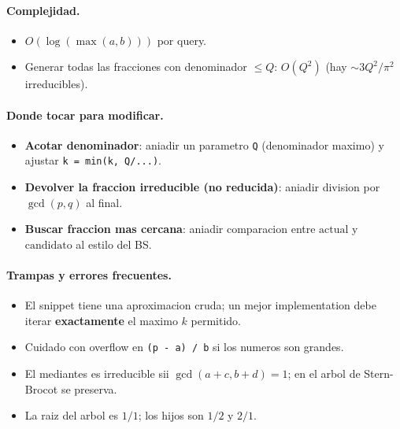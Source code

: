 \paragraph{Complejidad.}
\begin{itemize}\setlength\itemsep{0pt}
	\item $O(\log(\max(a,b)))$ por query.
	\item Generar todas las fracciones con denominador $\le Q$: $O(Q^2)$ (hay $\sim 3Q^2/\pi^2$ irreducibles).
\end{itemize}

\paragraph{Donde tocar para modificar.}
\begin{itemize}\setlength\itemsep{0pt}
	\item \textbf{Acotar denominador}: aniadir un parametro \texttt{Q} (denominador maximo) y ajustar \texttt{k = min(k, Q/...)}.
	\item \textbf{Devolver la fraccion irreducible (no reducida)}: aniadir division por $\gcd(p, q)$ al final.
	\item \textbf{Buscar fraccion mas cercana}: aniadir comparacion entre $\text{actual}$ y $\text{candidato}$ al estilo del BS.
\end{itemize}

\paragraph{Trampas y errores frecuentes.}
\begin{itemize}\setlength\itemsep{0pt}
	\item El snippet tiene una aproximacion cruda; un mejor implementation debe iterar \textbf{exactamente} el maximo $k$ permitido.
	\item Cuidado con overflow en \texttt{(p - a) / b} si los numeros son grandes.
	\item El mediantes es irreducible sii $\gcd(a+c, b+d) = 1$; en el arbol de Stern-Brocot se preserva.
	\item La raiz del arbol es $1/1$; los hijos son $1/2$ y $2/1$.
\end{itemize}

